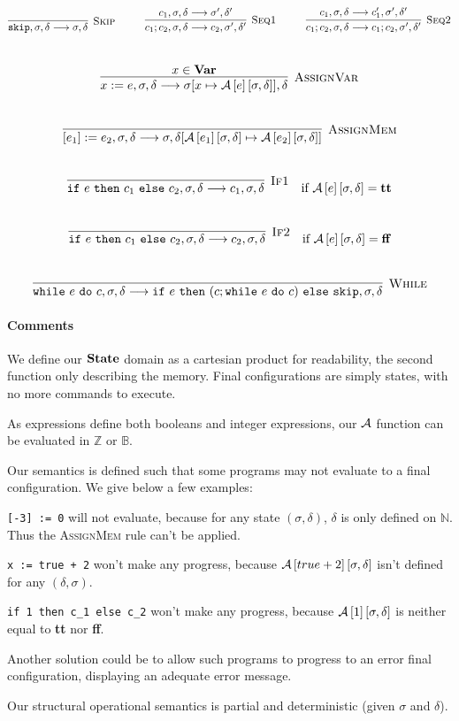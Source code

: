 \[
	\Rule{Skip}{\texttt{skip}, \sigma, \delta \longrightarrow \sigma, \delta}{} \hspace*{1cm}
	\Rule{Seq1}{c_1 ; c_2, \sigma, \delta \longrightarrow c_2, \sigma', \delta'}{c_1, \sigma, \delta \longrightarrow \sigma', \delta'} \hspace*{1cm}
	\Rule{Seq2}{c_1 ; c_2, \sigma, \delta \longrightarrow c_1 ; c_2, \sigma', \delta'}{c_1, \sigma, \delta \longrightarrow c_1', \sigma', \delta'}
\]
\\
\[
	\Rule{AssignVar}{x := e, \sigma, \delta \longrightarrow \sigma[x \mapsto \Aa{e}{\sigma, \delta}], \delta}{x \in \var{}}
\]
\\
\[
	\Rule{AssignMem}{[e_1] := e_2, \sigma, \delta \longrightarrow \sigma, \delta[\Aa{e_1}{\sigma, \delta} \mapsto \Aa{e_2}{\sigma, \delta}]}{}
\]
\\
\[
	\Rule{If1}{\texttt{if}~e~\texttt{then}~c_1~\texttt{else}~c_2, \sigma, \delta \longrightarrow c_1, \sigma, \delta}{} \quad \text{if $\Aa{e}{\sigma, \delta} = \true{}$}
\]
\\
\[
	\Rule{If2}{\texttt{if}~e~\texttt{then}~c_1~\texttt{else}~c_2, \sigma, \delta \longrightarrow c_2, \sigma, \delta}{} \quad \text{if $\Aa{e}{\sigma, \delta} = \false{}$}
\]
\\
\[
	\Rule{While}{\texttt{while}~e~\texttt{do}~c, \sigma, \delta \longrightarrow \texttt{if}~e~\texttt{then}~(c; \texttt{while}~e~\texttt{do}~c)~\texttt{else}~\texttt{skip}, \sigma, \delta}{} 
\]

\paragraph{Comments}
We define our $\mathbf{State}$ domain as a cartesian product for readability, the second function only describing the memory.
Final configurations are simply states, with no more commands to execute.

As expressions define both booleans and integer expressions, our $\mathcal{A}{}$ function can be evaluated in $\mathbb{Z}$ or $\mathbb{B}$.

Our semantics is defined such that some programs may not evaluate to a final configuration. We give below a few examples:

\texttt{[-3] := 0} will not evaluate, because for any state $(\sigma,\delta)$, $\delta$ is only defined on $\mathbb{N}$. Thus the \textsc{AssignMem} rule can't be applied.

\texttt{x := true + 2} won't make any progress, because $\mathcal{A}\left[true + 2\right]\left[\sigma,\delta\right]$ isn't defined for any $(\delta,\sigma)$.

\texttt{if 1 then c\_1 else c\_2} won't make any progress, because $\mathcal{A}\left[1\right]\left[\sigma,\delta\right]$ is neither equal to \textbf{tt} nor \textbf{ff}.

Another solution could be to allow such programs to progress to an error final configuration, displaying an adequate error message.

Our structural operational semantics is partial and deterministic (given $\sigma$ and $\delta$).
